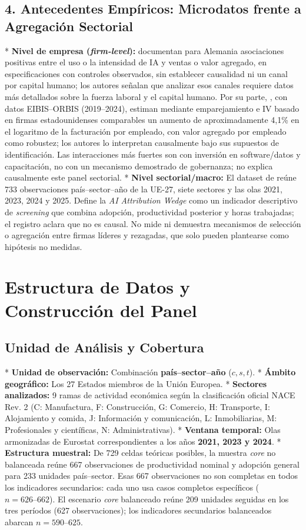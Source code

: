 \documentclass[12pt,a4paper]{article}
\begin{document}
\subsection{4. Antecedentes Empíricos: Microdatos frente a Agregación Sectorial}
* \textbf{Nivel de empresa (\textit{firm-level}):} \citet{czarnitzki2023firm} documentan para Alemania asociaciones positivas entre el uso o la intensidad de IA y ventas o valor agregado, en especificaciones con controles observados, sin establecer causalidad ni un canal por capital humano; los autores señalan que analizar esos canales requiere datos más detallados sobre la fuerza laboral y el capital humano. Por su parte, \citet{aldasoro2026adoption}, con datos EIBIS--ORBIS (2019--2024), estiman mediante emparejamiento e IV basado en firmas estadounidenses comparables un aumento de aproximadamente 4,1\% en el logaritmo de la facturación por empleado, con valor agregado por empleado como robustez; los autores lo interpretan causalmente bajo sus supuestos de identificación. Las interacciones más fuertes son con inversión en software/datos y capacitación, no con un mecanismo demostrado de gobernanza; no explica causalmente este panel sectorial.
* \textbf{Nivel sectorial/macro:} El dataset de \citet{yilmaz2026dataset} reúne 733 observaciones país--sector--año de la UE-27, siete sectores y las olas 2021, 2023, 2024 y 2025. Define la \textit{AI Attribution Wedge} como un indicador descriptivo de \textit{screening} que combina adopción, productividad posterior y horas trabajadas; el registro aclara que no es causal. No mide ni demuestra mecanismos de selección o agregación entre firmas líderes y rezagadas, que solo pueden plantearse como hipótesis no medidas.

\section{Estructura de Datos y Construcción del Panel}

\subsection{Unidad de Análisis y Cobertura}
* \textbf{Unidad de observación:} Combinación \textbf{país--sector--año} ($c, s, t$).
* \textbf{Ámbito geográfico:} Los 27 Estados miembros de la Unión Europea.
* \textbf{Sectores analizados:} 9 ramas de actividad económica según la clasificación oficial NACE Rev. 2 (C: Manufactura, F: Construcción, G: Comercio, H: Transporte, I: Alojamiento y comida, J: Información y comunicación, L: Inmobiliarias, M: Profesionales y científicas, N: Administrativas).
* \textbf{Ventana temporal:} Olas armonizadas de Eurostat correspondientes a los años \textbf{2021, 2023 y 2024}.
* \textbf{Estructura muestral:} De 729 celdas teóricas posibles, la muestra \textit{core} no balanceada reúne 667 observaciones de productividad nominal y adopción general para 233 unidades país--sector. Esas 667 observaciones no son completas en todos los indicadores secundarios: cada uno usa casos completos específicos ($n=626\text{--}662$). El escenario \textit{core} balanceado reúne 209 unidades seguidas en los tres períodos (627 observaciones); los indicadores secundarios balanceados abarcan $n=590\text{--}625$.
\end{document}
